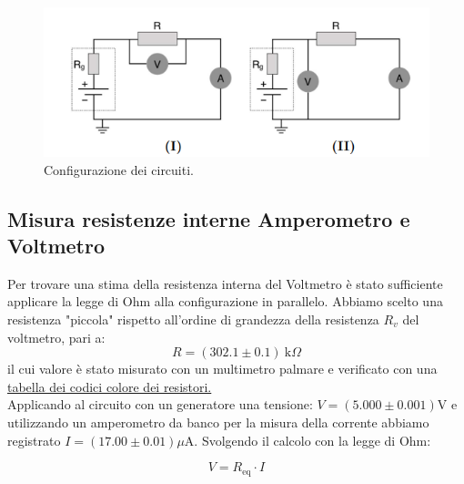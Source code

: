 \documentclass[letterpaper,12pt]{article}
\begin{document}
\begin{figure}[h!]
    \centering
    \includegraphics[width=.7\textwidth]{configurazioni.png}
    \caption{Configurazione dei circuiti.}
    \label{fig:Configurazioni_circuiti}
\end{figure}



\subsection{Misura resistenze interne Amperometro e Voltmetro}
Per trovare una stima della resistenza interna del Voltmetro è stato sufficiente applicare la legge di Ohm alla configurazione in parallelo. Abbiamo scelto una resistenza "piccola"  rispetto all'ordine di grandezza della resistenza $R_v$ del voltmetro, pari a: $$R = (302.1\pm0.1)\ \text{k}\Omega$$ il cui valore è stato misurato con un multimetro palmare e verificato con una \href{https://www.arrow.com/it-it/research-and-events/articles/resistor-color-code}{tabella dei codici colore dei resistori.}\\
Applicando al circuito con un generatore una tensione: $V = (5.000\pm0.001)$V e utilizzando un amperometro da banco per la misura della corrente abbiamo registrato $I = (17.00\pm0.01)\mu\text{A}$. Svolgendo il calcolo con la legge di Ohm: 

\begin{equation}
    V= R_{\text{eq}} \cdot I
    \label{legge di ohm}
\end{equation}
\end{document}
